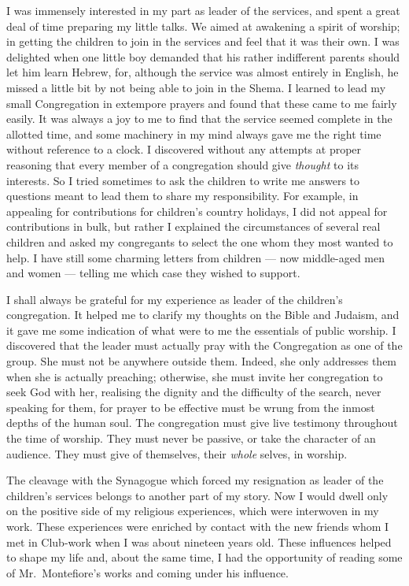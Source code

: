 I was immensely interested in my part as leader of
the services, and spent a great deal of time preparing my
little talks. We aimed at awakening a spirit of worship;
in getting the children to join in the services and feel
that it was their own. I was delighted when one little
boy demanded that his rather indifferent parents should
let him learn Hebrew, for, although the service was
almost entirely in English, he missed a little bit by not
being able to join in the Shema. I learned to lead my
small Congregation in extempore prayers and found that
these came to me fairly easily. It was always a joy to
me to find that the service seemed complete in the
allotted time, and some machinery in my mind always
gave me the right time without reference to a clock. I
discovered without any attempts at proper reasoning
that every member of a congregation should give
\textsl{thought} to its interests. So I tried sometimes to ask the
children to write me answers to questions meant to
lead them to share my responsibility. For example, in
appealing for contributions for children’s country
holidays, I did not appeal for contributions in bulk, but
rather I explained the circumstances of several real
children and asked my congregants to select the one
whom they most wanted to help. I have still some
charming letters from children — now middle-aged men
and women — telling me which case they wished to
support.

I shall always be grateful for my experience as
leader of the children’s congregation. It helped me to
clarify my thoughts on the Bible and Judaism, and it
gave me some indication of what were to me the essentials
of public worship. I discovered that the leader must
actually pray with the Congregation as one of the group.
She must not be anywhere outside them. Indeed, she
only addresses them when she is actually preaching;
otherwise, she must invite her congregation to seek God
with her, realising the dignity and the difficulty of the
search, never speaking for them, for prayer to be effective
must be wrung from the inmost depths of the human soul.
The congregation must give live testimony throughout
the time of worship. They must never be passive, or
take the character of an audience. They must give of
themselves, their \textsl{whole} selves, in worship.

The cleavage with the Synagogue which forced my
resignation as leader of the children’s services belongs
to another part of my story. Now I would dwell only
on the positive side of my religious experiences, which
were interwoven in my work. These experiences were
enriched by contact with the new friends whom I met
in Club-work when I was about nineteen years old.
These influences helped to shape my life and, about the
same time, I had the opportunity of reading some of
Mr.\ Montefiore’s works and coming under his influence.
